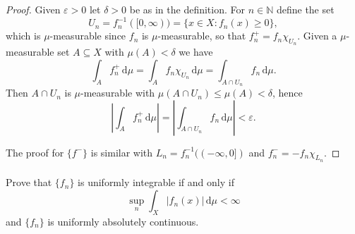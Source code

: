 \documentclass[12pt]{article}
\newlength{\myparskip}
\newenvironment{fullbox}{\begin{lrbox}{\savefullbox}\begin{minipage}{\dimexpr\textwidth-2\fboxsep\relax}\setlength{\parskip}{\myparskip}}{\end{minipage}\end{lrbox}\framebox[\textwidth]{\usebox{\savefullbox}}}
\newenvironment{pbox}[1][]{\begin{fullbox}\ifx#1\empty\else\paragraph{#1}\phantom{}\fi}{\end{fullbox}}
\theoremstyle{definition}
\newcommand{\N}{\mathbb{N}}
\newcommand{\eps}{\varepsilon}
\newcommand{\<}{\langle}
\renewcommand{\>}{\rangle}
\newcommand{\dd}{\,\mathrm{d}}
\newcommand{\abs}[1]{\left|#1\right|}
\begin{document}
\begin{proof}
    Given $\eps > 0$ let $\delta > 0$ be as in the definition.
    For $n \in \N$ define the set
    \[
        U_n = f_n^{-1}([0, \infty)) = \{x \in X : f_n(x) \geq 0\},
    \]
    which is $\mu$-measurable since $f_n$ is $\mu$-measurable, so that $f_n^+ = f_n\chi_{U_n}$.
    Given a $\mu$-measurable set $A \subseteq X$ with $\mu(A) < \delta$ we have
    \[
        \int_A f_n^+ \dd\mu
            = \int_A f_n \chi_{U_n} \dd\mu
            = \int_{A \cap U_n} f_n \dd\mu.
    \]
    Then $A \cap U_n$ is $\mu$-measurable with $\mu(A \cap U_n) \leq \mu(A) < \delta$, hence
    \[
        \abs{\int_A f_n^+ \dd\mu}
            = \abs{\int_{A \cap U_n} f_n \dd\mu}
            < \eps.
    \]

    The proof for $\{f^-\}$ is similar with $L_n = f_n^{-1}((-\infty, 0])$ and $f_n^- = -f_n\chi_{L_n}$.
\end{proof}


\begin{pbox}
    Prove that $\{f_n\}$ is uniformly integrable if and only if
    \[
        \sup_{n} \int_X |f_n(x)| \dd\mu < \infty
    \]
    and $\{f_n\}$ is uniformly absolutely continuous.
\end{pbox}
\end{document}
